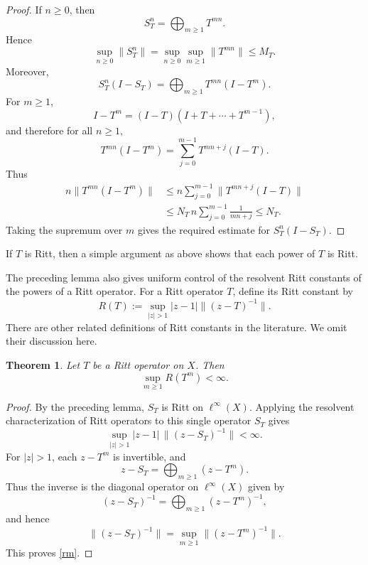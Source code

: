 \documentclass[11pt]{amsart}
\numberwithin{equation}{section}
\newtheorem{theorem}{Theorem}[section]
\theoremstyle{definition}
\theoremstyle{plain}
\begin{document}
\begin{proof}
If $n\ge0$, then
\[
  S_T^n=\bigoplus_{m\ge1}T^{mn}.
\]
Hence
\[
  \sup_{n\ge0}\|S_T^n\|
  =\sup_{n\ge0}\sup_{m\ge1}\|T^{mn}\|
  \le M_T .
\]
Moreover,
\[
  S_T^n(I-S_T)=\bigoplus_{m\ge1}T^{mn}(I-T^m).
\]
For $m \ge1$,
\[
  I-T^m=(I-T)(I+T+\cdots+T^{m-1}),
\]
and therefore for all $n \ge 1,$
\[
  T^{mn}(I-T^m)
  =\sum_{j=0}^{m-1}T^{mn+j}(I-T).
\]
Thus
\[
\begin{aligned}
  n\|T^{mn}(I-T^m)\|
  &\le n\sum_{j=0}^{m-1}\|T^{mn+j}(I-T)\|  \\
  &\le N_T\, n\sum_{j=0}^{m-1}\frac1{mn+j}
  \le N_T .
\end{aligned}
\]
Taking the supremum over $m$ gives the required estimate for
$S_T^n(I-S_T)$.
\end{proof}

If $T$ is Ritt, then a simple argument as above shows
that each power of $T$ is Ritt.

 The preceding lemma also gives uniform control of the resolvent Ritt constants of the powers of a Ritt operator.
 For a Ritt operator $T$, define its Ritt constant by 
\[
        R(T):=\sup_{|z|>1}|z-1|\|(z-T)^{-1}\|.
\]
There are other related definitions of Ritt constants in the literature.
We omit their discussion here. 
\begin{theorem}\label{ritt_constants}
Let $T$ be a Ritt operator on $X$. Then
\begin{equation}\label{rm}
  \sup_{m\ge1}R(T^m)
  <\infty.
\end{equation}
\end{theorem}

\begin{proof}
By the preceding lemma, $S_T$ is Ritt on $\ell^\infty(X)$. Applying the
resolvent characterization of Ritt operators to this single operator
$S_T$ gives
\[
  \sup_{|z|>1}|z-1|\,\|(z-S_T)^{-1}\|<\infty .
\]
For $|z|>1$, each $z-T^m$ is invertible, and
\[
  z-S_T=\bigoplus_{m\ge1}(z-T^m).
\]
Thus the inverse is the diagonal operator on $\ell^\infty(X)$ given by
\[
  (z-S_T)^{-1}=\bigoplus_{m\ge1}(z-T^m)^{-1},
\]
and hence
\[
  \|(z-S_T)^{-1}\|
  =\sup_{m\ge1}\|(z-T^m)^{-1}\|.
\]
This proves \eqref{rm}.


\end{proof}
\end{document}
